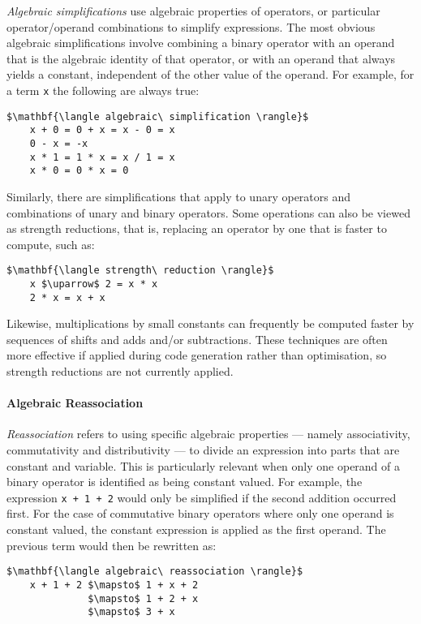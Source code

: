 \emph{Algebraic simplifications} use algebraic properties of operators, or
particular operator/operand combinations to simplify expressions. The most
obvious algebraic simplifications involve combining a binary operator with an
operand that is the algebraic identity of that operator, or with an operand that
always yields a constant, independent of the other value of the operand. For
example, for a term \texttt{x} the following are always true:
%
\begin{lstlisting}[style=Haskell,numbers=none,mathescape]
$\mathbf{\langle algebraic\ simplification \rangle}$
    x + 0 = 0 + x = x - 0 = x
    0 - x = -x
    x * 1 = 1 * x = x / 1 = x
    x * 0 = 0 * x = 0
\end{lstlisting}
%
Similarly, there are simplifications that apply to unary operators and
combinations of unary and binary operators. Some operations can also be viewed
as strength reductions, that is, replacing an operator by one that is faster to
compute, such as:
%
\begin{lstlisting}[style=Haskell,numbers=none,mathescape]
$\mathbf{\langle strength\ reduction \rangle}$
    x $\uparrow$ 2 = x * x
    2 * x = x + x
\end{lstlisting}
%
Likewise, multiplications by small constants can frequently be computed faster
by sequences of shifts and adds and/or subtractions. These techniques are often
more effective if applied during code generation rather than optimisation, so
strength reductions are not currently applied.


\paragraph{Algebraic Reassociation}

\emph{Reassociation} refers to using specific algebraic properties --- namely
associativity, commutativity and distributivity --- to divide an expression into
parts that are constant and variable.
This is particularly relevant when only one operand of a binary
operator is identified as being constant valued. For example, the expression
\lstinline{x + 1 + 2} would only be simplified if the second addition occurred
first. For the case of commutative binary operators where only one operand is
constant valued, the constant expression is applied as the first operand. The
previous term would then be rewritten as:
%
\begin{lstlisting}[style=Haskell,numbers=none,mathescape]
$\mathbf{\langle algebraic\ reassociation \rangle}$
    x + 1 + 2 $\mapsto$ 1 + x + 2
              $\mapsto$ 1 + 2 + x
              $\mapsto$ 3 + x
\end{lstlisting}


